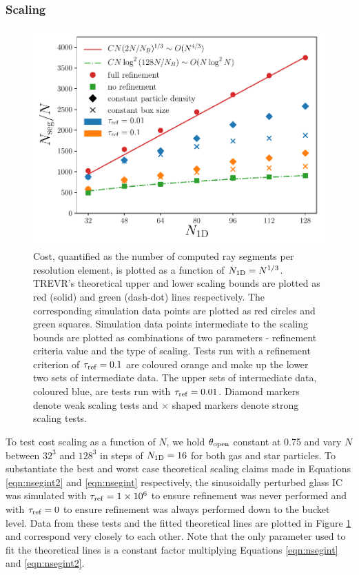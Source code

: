 \documentclass[fleq,usenatbib]{mnras}
\newcommand{\acro}{TREVR}
\providecommand{\e}[1]{\ensuremath{\times10^{#1}}}
\newcommand{\tr}{\tau_{\rm ref}}
\newcommand{\tO}{\theta_{\rm open}}
\begin{document}
{\subsubsection{Scaling}
\begin{figure}
\includegraphics[width=1\linewidth]{Figures/particle_scaling.pdf}
\caption{Cost, quantified as the number of computed ray segments per 
resolution element, is plotted as a function of $N_{\rm 1D} = N^{1/3}$. 
\acro{}'s theoretical upper and lower scaling bounds are plotted as red 
(solid) and green (dash-dot) lines respectively. The corresponding simulation 
data points are plotted as red circles and green squares. Simulation data 
points intermediate to the scaling bounds are plotted as combinations of two 
parameters - refinement criteria value and the type of scaling. Tests run 
with a refinement criterion of $\tr=0.1$ are coloured orange and make up the 
lower two sets of intermediate data. The upper sets of intermediate data, 
coloured blue, are tests run with $\tr=0.01$. Diamond markers denote weak 
scaling tests and $\times$ shaped markers denote strong scaling tests.}
\label{fig:pscale}
\end{figure}
To test cost scaling as a function of $N$, we hold $\tO$ constant at 0.75 and
vary $N$ between $32^3$ and $128^3$ in steps of $N_{\rm 1D} = 16$ for both gas 
and star particles. To substantiate the best and worst case theoretical 
scaling claims made in Equations \ref{eqn:nsegint2} and \ref{eqn:nsegint} 
respectively, the sinusoidally perturbed glass IC was simulated with 
$\tr=1\e 6$ to ensure refinement was never performed and with $\tr=0$ to 
ensure refinement was always performed down to the bucket level. Data from 
these tests and the fitted theoretical lines are plotted in Figure 
\ref{fig:pscale} and correspond very closely to each other. Note that the only 
parameter used to fit the theoretical lines is a constant factor multiplying 
Equations \ref{eqn:nsegint} and \ref{eqn:nsegint2}.

}
\end{document}
